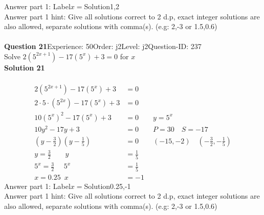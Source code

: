 \documentclass{article}
\begin{document}
Answer part 1: \hspace{10pt}Label\hspace{10pt}$x=$\hspace{10pt}Solution\hspace{10pt}1,2\\
Answer part 1 hint: \hspace{15pt}Give all solutions correct to 2 d.p, exact integer solutions are also allowed, separate solutions with comma(s).  (e.g:  2,-3 or 1.5,0.6)  \\
\\[4pt]
\noindent\textbf{Question 21}\hspace{20pt}Experience: 50\hspace{20pt}Order: j2\hspace{20pt}Level: j2\hspace{20pt}Question-ID: 237\\[2pt]
Solve $2(5^{2x+1})-17(5^x)+3=0$ for $x$\\[4pt]
\noindent\textbf{Solution 21}\\[2pt]
\\[-35pt]\begin{align*}
2(5^{2x+1})-17(5^x)+3&=0\\[2pt]
2\!\cdot\!5\!\cdot\!(5^{2x})-17(5^x)+3&=0\\[2pt]
10(5^{x})^2-17(5^x)+3&=0\qquad y=5^x\\[2pt]
10y^2-17y+3&=0\qquad P=30 \quad S=-17\\[2pt]
\left(y-\displaystyle\frac{3}{2}\right)\left(y-\displaystyle\frac{1}{5}\right)&=0\qquad (-15,-2)\quad \left(-\displaystyle\frac{3}{2},-\displaystyle\frac{1}{5}\right)\\[2pt]
y=\displaystyle\frac{3}{2} \qquad y&=\displaystyle\frac{1}{5}\\[2pt]
5^x=\displaystyle\frac{3}{2}\hspace{16pt} 5^x&=\displaystyle\frac{1}{5}\\[2pt]
x=0.25 \hspace{6pt} x&=-1
\end{align*}
Answer part 1: \hspace{10pt}Label\hspace{10pt}$x=$\hspace{10pt}Solution\hspace{10pt}0.25,-1\\
Answer part 1 hint: \hspace{15pt}Give all solutions correct to 2 d.p, exact integer solutions are also allowed, separate solutions with comma(s).  (e.g:  2,-3 or 1.5,0.6)  \\
\end{document}
